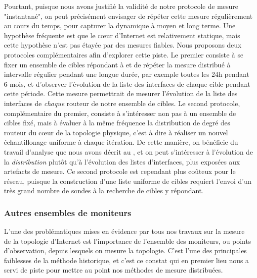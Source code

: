 Pourtant, puisque nous avons justifié la validité de notre protocole de mesure
"instantané", on peut précisément envisager de répéter cette mesure
régulièrement au cours du temps, pour capturer la dynamique à moyen et long
terme. Une hypothèse fréquente est que le c\oe{}ur d'Internet est relativement
statique, mais cette hypothèse n'est pas étayée par des mesures fiables. Nous
proposons deux protocoles complémentaires afin d'explorer cette piste. Le
premier consiste à se fixer un ensemble de cibles répondant à \udpping et de
répéter la mesure \udpping distribué à intervalle régulier pendant une longue
durée, par exemple toutes les 24h pendant 6 mois, et d'observer l'évolution de
la liste des interfaces de chaque cible pendant cette période. Cette mesure
permettrait de mesurer l'évolution de la liste des interfaces de {\em chaque}
routeur de notre ensemble de cibles. Le second protocole, complémentaire du
premier, consiste à s'intéresser non pas à un ensemble de cibles fixé, mais à
évaluer à la même fréquence la distribution de degré des routeur du c\oe{}ur de
la topologie physique, c'est à dire à réaliser un nouvel échantillonage uniforme
à chaque itération. De cette manière, on bénéficie du travail d'analyse que nous
avons décrit au , et on peut s'intéresser à l'évolution de la
{\em distribution} plutôt qu'à l'évolution des listes d'interfaces, plus
exposées aux artefacts de mesure. Ce second protocole est cependant plus coûteux
pour le réseau, puisque la construction d'une liste uniforme de cibles requiert
l'envoi d'un très grand nombre de sondes \udpping à la recherche de cibles y
répondant.

\subsubsection{Autres ensembles de moniteurs}

L'une des problématiques mises en évidence par tous nos travaux sur la mesure
de la topologie d'Internet est l'importance de l'ensemble des moniteurs, ou
points d'observation, depuis lesquels on mesure la topologie. C'est l'une des
principales faiblesses de la méthode historique, et c'est ce constat qui en
premier lieu nous a servi de piste pour mettre au point nos méthodes de mesure
distribuées.

